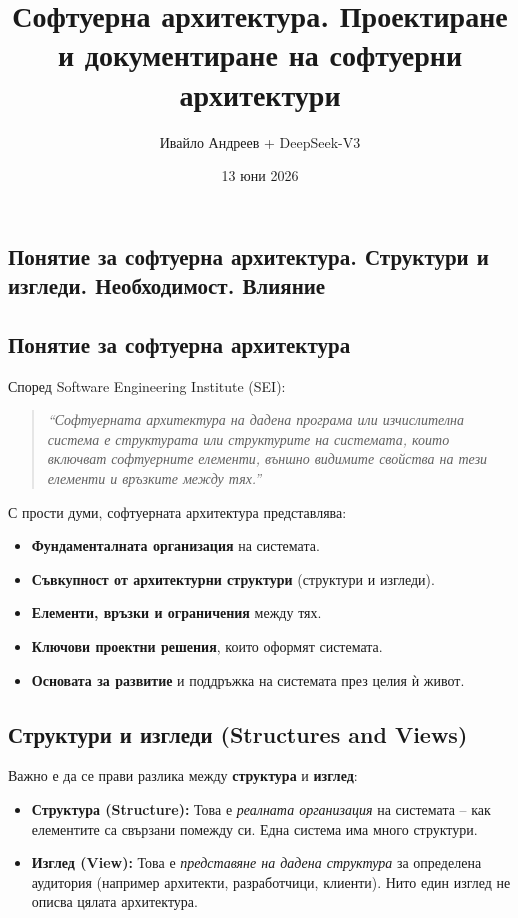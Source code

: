 \documentclass{scrartcl}
\title{Софтуерна архитектура. Проектиране и документиране на софтуерни архитектури}
\author{Ивайло Андреев + DeepSeek-V3}
\date{13 юни 2026}
\begin{document}
\maketitle
\tableofcontents
\newpage

\begin{FlushLeft}

\section{Понятие за софтуерна архитектура. Структури и изгледи. Необходимост. Влияние}

\subsection{Понятие за софтуерна архитектура}

Според Software Engineering Institute (SEI):

\begin{quote}
    \textit{“Софтуерната архитектура на дадена програма или изчислителна система е структурата или структурите на системата, които включват софтуерните елементи, външно видимите свойства на тези елементи и връзките между тях.”}
\end{quote}

С прости думи, софтуерната архитектура представлява:
\begin{itemize}
    \item \textbf{Фундаменталната организация} на системата.
    \item \textbf{Съвкупност от архитектурни структури} (структури и изгледи).
    \item \textbf{Елементи, връзки и ограничения} между тях.
    \item \textbf{Ключови проектни решения}, които оформят системата.
    \item \textbf{Основата за развитие} и поддръжка на системата през целия ѝ живот.
\end{itemize}

\subsection{Структури и изгледи (Structures and Views)}

Важно е да се прави разлика между \textbf{структура} и \textbf{изглед}:
\begin{itemize}
    \item \textbf{Структура (Structure):} Това е \textit{реалната организация} на системата – как елементите са свързани помежду си. Една система има много структури.
    \item \textbf{Изглед (View):} Това е \textit{представяне на дадена структура} за определена аудитория (например архитекти, разработчици, клиенти). Нито един изглед не описва цялата архитектура.
\end{itemize}


\end{FlushLeft}
\end{document}
